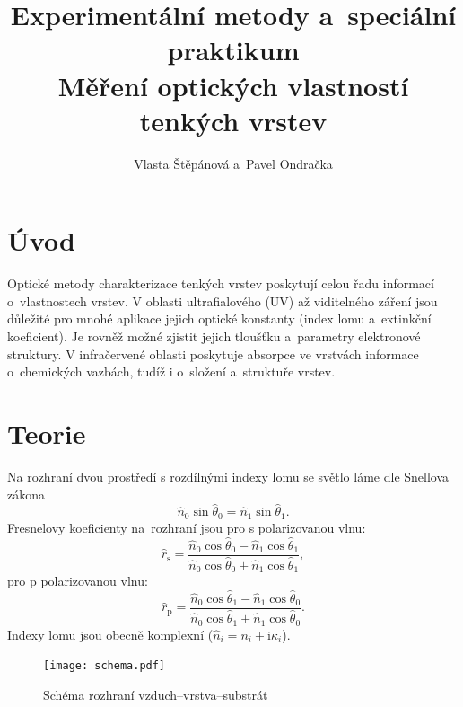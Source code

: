 \documentclass[12pt]{article}
\begin{document}
\title{Experimentální metody a~speciální praktikum \\
Měření optických vlastností tenkých vrstev}

\author{Vlasta Štěpánová a~Pavel Ondračka}
\maketitle

\section{Úvod}
Optické metody charakterizace tenkých vrstev poskytují celou řadu informací o~vlastnostech vrstev. V oblasti ultrafialového (UV) až viditelného záření jsou důležité pro mnohé aplikace jejich optické konstanty (index lomu a~extinkční koeficient). Je rovněž možné zjistit jejich tloušťku a~parametry elektronové struktury. V infračervené oblasti poskytuje absorpce ve vrstvách informace o~chemických vazbách, tudíž i o~složení a~struktuře vrstev.

\section{Teorie}

Na rozhraní dvou prostředí s rozdílnými indexy lomu se světlo láme dle Snellova zákona
\begin{equation}
\hat{n}_0 \sin\hat{\theta}_0 = \hat{n}_1 \sin\hat{\theta}_1 \mathrm{.}
\end{equation}
Fresnelovy koeficienty na~rozhraní jsou pro s polarizovanou vlnu: 
\begin{equation}
\hat{r}_\mathrm{s} = \frac{ \hat{n}_0 \cos \hat{\theta}_0 - \hat{n}_1 \cos \hat{\theta}_1}{ \hat{n}_0 \cos \hat{\theta}_0 + \hat{n}_1 \cos \hat{\theta}_1}  \mathrm{,}
\end{equation}
pro p polarizovanou vlnu: 
\begin{equation}
\hat{r}_\mathrm{p} = \frac{ \hat{n}_0 \cos \hat{\theta}_1 - \hat{n}_1 \cos \hat{\theta}_0}{ \hat{n}_0 \cos \hat{\theta}_1 + \hat{n}_1 \cos \hat{\theta}_0}  \mathrm{.}
\end{equation}
Indexy lomu jsou obecně komplexní ($\hat{n}_i = n_i + \mathrm{i} \kappa_i$).

\begin{figure}
  \centering
  \texttt{[image: schema.pdf]}
  \caption{Schéma rozhraní vzduch--vrstva--substrát}
  \label{schema}
\end{figure}
\end{document}
